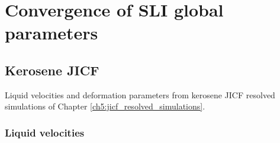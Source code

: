 \chapter{Convergence of SLI global parameters}
\label{app:SLI_convergence}


\section{Kerosene JICF}

Liquid velocities and deformation parameters from kerosene JICF resolved simulations of Chapter \ref{ch5:jicf_resolved_simulations}.


\subsection*{Liquid velocities}

